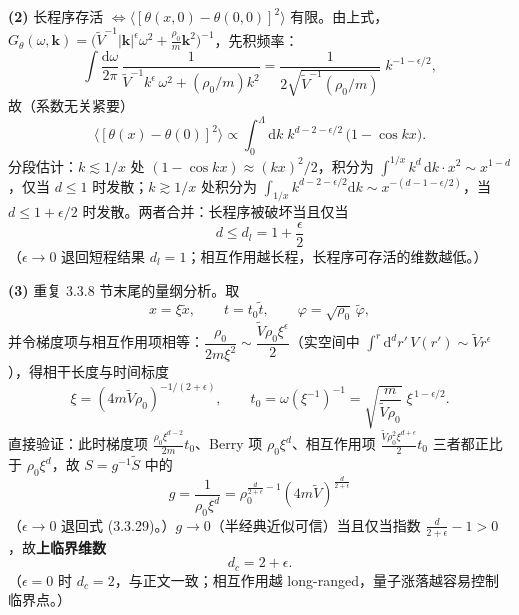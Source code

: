 \textbf{(2)} 长程序存活 $\Leftrightarrow\langle[\theta(x,0)-\theta(0,0)]^{2}\rangle$ 有限。由上式，$G_\theta(\omega,\pmb{k})=\big(\tilde V^{-1}|\pmb{k}|^{\epsilon}\omega^{2}+\frac{\rho_0}{m}\pmb{k}^{2}\big)^{-1}$，先积频率：
\begin{equation*}
\int\frac{\mathrm{d}\omega}{2\pi}\,
\frac{1}{\tilde V^{-1}k^{\epsilon}\,\omega^{2}+(\rho_0/m)k^{2}}
=\frac{1}{2\sqrt{\tilde V^{-1}(\rho_0/m)}}\;k^{-1-\epsilon/2} ,
\end{equation*}
故（系数无关紧要）
\begin{equation*}
\langle[\theta(x)-\theta(0)]^{2}\rangle\propto
\int_0^\Lambda\mathrm{d}k\;k^{d-2-\epsilon/2}\,\big(1-\cos kx\big) .
\end{equation*}
分段估计：$k\lesssim1/x$ 处 $(1-\cos kx)\approx(kx)^{2}/2$，积分为 $\int^{1/x}k^{d}\,\mathrm{d}k\cdot x^{2}\sim x^{1-d}$，仅当 $d\le1$ 时发散；$k\gtrsim1/x$ 处积分为 $\int_{1/x}k^{d-2-\epsilon/2}\mathrm{d}k\sim x^{-(d-1-\epsilon/2)}$，当 $d\le1+\epsilon/2$ 时发散。两者合并：长程序被破坏当且仅当
\begin{equation*}
\boxed{\;d\le d_l=1+\frac{\epsilon}{2}\;}
\end{equation*}
（$\epsilon\to0$ 退回短程结果 $d_l=1$；相互作用越长程，长程序可存活的维数越低。）

\textbf{(3)} 重复 3.3.8 节末尾的量纲分析。取
\begin{equation*}
x=\xi\tilde x,\qquad t=t_0\tilde t,\qquad \varphi=\sqrt{\rho_0}\,\tilde\varphi ,
\end{equation*}
并令梯度项与相互作用项相等：$\dfrac{\rho_0}{2m\xi^{2}}\sim\dfrac{\tilde V\rho_0\xi^{\epsilon}}{2}$（实空间中 $\int^{r}\mathrm{d}^dr'\,V(r')\sim\tilde Vr^{\epsilon}$），得相干长度与时间标度
\begin{equation*}
\xi=(4m\tilde V\rho_0)^{-1/(2+\epsilon)},\qquad
t_0=\omega(\xi^{-1})^{-1}=\sqrt{\frac{m}{\tilde V\rho_0}}\;\xi^{\,1-\epsilon/2} .
\end{equation*}
直接验证：此时梯度项 $\frac{\rho_0\xi^{d-2}}{2m}t_0$、Berry 项 $\rho_0\xi^{d}$、相互作用项 $\frac{\tilde V\rho_0^{2}\xi^{d+\epsilon}}{2}t_0$ 三者都正比于 $\rho_0\xi^{d}$，故 $S=g^{-1}\tilde S$ 中的
\begin{equation*}
\boxed{\;g=\frac{1}{\rho_0\xi^{d}}=\rho_0^{\frac{d}{2+\epsilon}-1}(4m\tilde V)^{\frac{d}{2+\epsilon}}\;}
\end{equation*}
（$\epsilon\to0$ 退回式 (3.3.29)。）$g\to0$（半经典近似可信）当且仅当指数 $\frac{d}{2+\epsilon}-1>0$，故\textbf{上临界维数}
\begin{equation*}
d_c=2+\epsilon .
\end{equation*}
（$\epsilon=0$ 时 $d_c=2$，与正文一致；相互作用越 long-ranged，量子涨落越容易控制临界点。）

